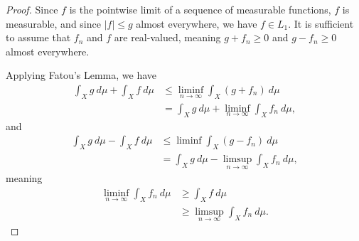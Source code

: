 \documentclass[10pt]{mypackage}
\begin{document}
\begin{proof}
  Since $f$ is the pointwise limit of a sequence of measurable functions, $f$ is measurable, and since $\left\vert f \right\vert \leq g$ almost everywhere, we have $f\in L_1$. It is sufficient to assume that $f_n$ and $f$ are real-valued, meaning $g + f_n \geq 0$ and $g - f_n\geq 0$ almost everywhere.\newline

  Applying Fatou's Lemma, we have
  \begin{align*}
    \int_{X}^{} g\:d\mu + \int_{X}^{}f\:d\mu &\leq \liminf_{n\rightarrow\infty} \int_{X}^{} \left(g + f_n\right)\:d\mu\\
                                             &= \int_{X}^{} g\:d\mu + \liminf_{n\rightarrow\infty}\int_{X}^{} f_n\:d\mu,
  \end{align*}
  and
  \begin{align*}
    \int_{X}^{} g\:d\mu - \int_{X}^{} f\:d\mu &\leq \liminf \int_{X}^{} \left( g-f_n \right)\:d\mu\\
                                              &= \int_{X}^{} g\:d\mu - \limsup_{n\rightarrow\infty} \int_{X}^{} f_n\:d\mu,
  \end{align*}
  meaning
  \begin{align*}
    \liminf_{n\rightarrow\infty} \int_{X}^{} f_n\:d\mu &\geq \int_{X}^{} f\:d\mu\\
                                                       &\geq \limsup_{n\rightarrow\infty}\int_{X}^{} f_n\:d\mu.
  \end{align*}
  
\end{proof}
\end{document}
